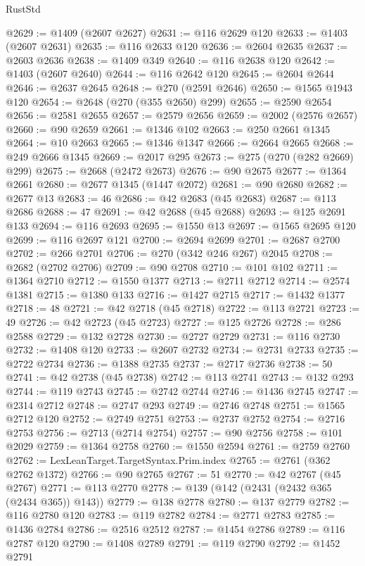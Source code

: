 \begin{lexlean}{RustStd}
\begin{coremodule}
@2629 := @1409 (@2607 @2627)
@2631 := @116 @2629 @120
@2633 := @1403 (@2607 @2631)
@2635 := @116 @2633 @120
@2636 := @2604 @2635
@2637 := @2603 @2636
@2638 := @1409 @349
@2640 := @116 @2638 @120
@2642 := @1403 (@2607 @2640)
@2644 := @116 @2642 @120
@2645 := @2604 @2644
@2646 := @2637 @2645
@2648 := @270 (@2591 @2646)
@2650 := @1565 @1943 @120
@2654 := @2648 (@270 (@355 @2650) @299)
@2655 := @2590 @2654
@2656 := @2581 @2655
@2657 := @2579 @2656
@2659 := @2002 (@2576 @2657)
@2660 := @90 @2659
@2661 := @1346 @102
@2663 := @250 @2661 @1345
@2664 := @10 @2663
@2665 := @1346 @1347
@2666 := @2664 @2665
@2668 := @249 @2666 @1345
@2669 := @2017 @295
@2673 := @275 (@270 (@282 @2669) @299)
@2675 := @2668 (@2472 @2673)
@2676 := @90 @2675
@2677 := @1364 @2661
@2680 := @2677 @1345 (@1447 @2072)
@2681 := @90 @2680
@2682 := @2677 @13
@2683 := 46
@2686 := @42 @2683 (@45 @2683)
@2687 := @113 @2686
@2688 := 47
@2691 := @42 @2688 (@45 @2688)
@2693 := @125 @2691 @133
@2694 := @116 @2693
@2695 := @1550 @13
@2697 := @1565 @2695 @120
@2699 := @116 @2697 @121
@2700 := @2694 @2699
@2701 := @2687 @2700
@2702 := @266 @2701
@2706 := @270 (@342 @246 @267) @2045
@2708 := @2682 (@2702 @2706)
@2709 := @90 @2708
@2710 := @101 @102
@2711 := @1364 @2710
@2712 := @1550 @1377
@2713 := @2711 @2712
@2714 := @2574 @1381
@2715 := @1380 @133
@2716 := @1427 @2715
@2717 := @1432 @1377
@2718 := 48
@2721 := @42 @2718 (@45 @2718)
@2722 := @113 @2721
@2723 := 49
@2726 := @42 @2723 (@45 @2723)
@2727 := @125 @2726
@2728 := @286 @2588
@2729 := @132 @2728
@2730 := @2727 @2729
@2731 := @116 @2730
@2732 := @1408 @120
@2733 := @2607 @2732
@2734 := @2731 @2733
@2735 := @2722 @2734
@2736 := @1388 @2735
@2737 := @2717 @2736
@2738 := 50
@2741 := @42 @2738 (@45 @2738)
@2742 := @113 @2741
@2743 := @132 @293
@2744 := @119 @2743
@2745 := @2742 @2744
@2746 := @1436 @2745
@2747 := @2314 @2712
@2748 := @2747 @293
@2749 := @2746 @2748
@2751 := @1565 @2712 @120
@2752 := @2749 @2751
@2753 := @2737 @2752
@2754 := @2716 @2753
@2756 := @2713 (@2714 @2754)
@2757 := @90 @2756
@2758 := @101 @2029
@2759 := @1364 @2758
@2760 := @1550 @2594
@2761 := @2759 @2760
@2762 := LexLeanTarget.TargetSyntax.Prim.index
@2765 := @2761 (@362 @2762 @1372)
@2766 := @90 @2765
@2767 := 51
@2770 := @42 @2767 (@45 @2767)
@2771 := @113 @2770
@2778 := @139 (@142 (@2431 (@2432 @365 (@2434 @365)) @143))
@2779 := @138 @2778
@2780 := @137 @2779
@2782 := @116 @2780 @120
@2783 := @119 @2782
@2784 := @2771 @2783
@2785 := @1436 @2784
@2786 := @2516 @2512
@2787 := @1454 @2786
@2789 := @116 @2787 @120
@2790 := @1408 @2789
@2791 := @119 @2790
@2792 := @1452 @2791

\end{coremodule}
\end{lexlean}
